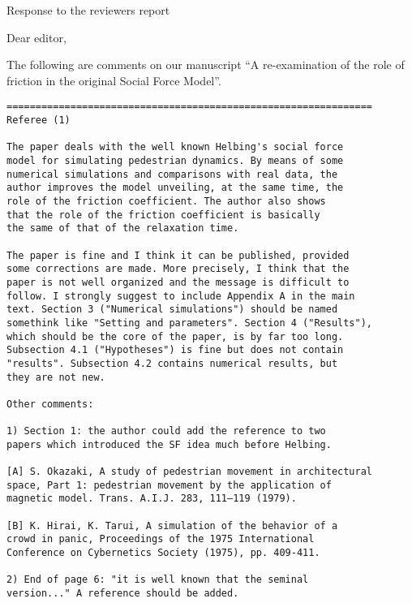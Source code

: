 \documentclass[a4paper,12pt]{letter}
\begin{document}

\begin{letter}{Response to the reviewers report}

\opening{}

Dear editor, 

The following are comments on our manuscript ``A re-examination of the role 
of friction in the original Social Force Model''. 



\begin{verbatim}
===============================================================
Referee (1)

The paper deals with the well known Helbing's social force 
model for simulating pedestrian dynamics. By means of some 
numerical simulations and comparisons with real data, the 
author improves the model unveiling, at the same time, the 
role of the friction coefficient. The author also shows 
that the role of the friction coefficient is basically 
the same of that of the relaxation time.

The paper is fine and I think it can be published, provided 
some corrections are made. More precisely, I think that the 
paper is not well organized and the message is difficult to 
follow. I strongly suggest to include Appendix A in the main 
text. Section 3 ("Numerical simulations") should be named 
somethink like "Setting and parameters". Section 4 ("Results"),
which should be the core of the paper, is by far too long. 
Subsection 4.1 ("Hypotheses") is fine but does not contain 
"results". Subsection 4.2 contains numerical results, but 
they are not new.

Other comments:

1) Section 1: the author could add the reference to two 
papers which introduced the SF idea much before Helbing.

[A] S. Okazaki, A study of pedestrian movement in architectural
space, Part 1: pedestrian movement by the application of 
magnetic model. Trans. A.I.J. 283, 111–119 (1979).

[B] K. Hirai, K. Tarui, A simulation of the behavior of a 
crowd in panic, Proceedings of the 1975 International 
Conference on Cybernetics Society (1975), pp. 409-411.

2) End of page 6: "it is well known that the seminal 
version..." A reference should be added.


\end{verbatim}
\end{letter}
\end{document}
